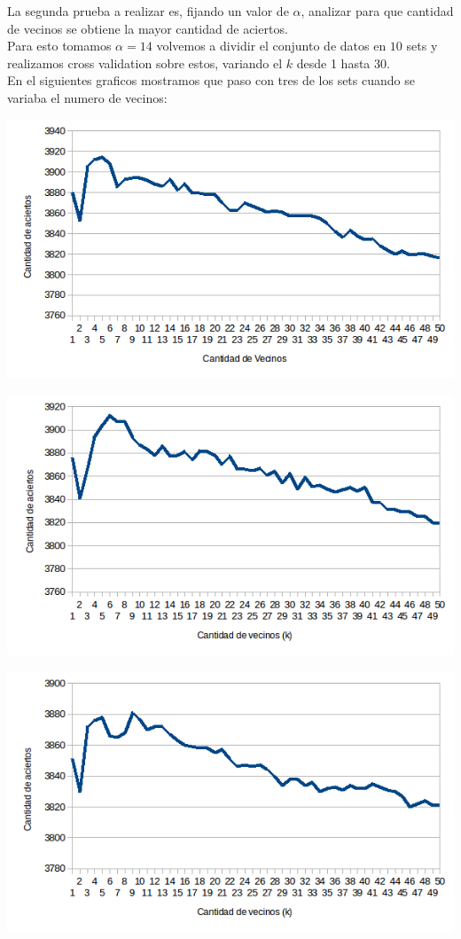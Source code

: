 La segunda prueba a realizar es, fijando un valor de $\alpha$, analizar para que cantidad de vecinos se obtiene la mayor cantidad de aciertos.
\\
Para esto tomamos $\alpha = 14$ volvemos a dividir el conjunto de datos en $10$ sets y realizamos cross validation sobre estos, variando el $k$ desde 1 hasta $30$.
\\
En el siguientes graficos mostramos que paso con tres de los sets cuando se variaba el numero de vecinos:
\begin{center}
\includegraphics[scale=0.6]{nuevosResultados/pca/k/1.png}\\
\end{center}
\begin{center}
\includegraphics[scale=0.6]{nuevosResultados/pca/k/2.png}\\
\end{center}
\begin{center}
\includegraphics[scale=0.6]{nuevosResultados/pca/k/3.png}\\
\end{center}

